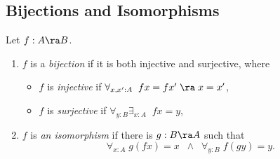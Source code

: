 \subsection{Bijections and Isomorphisms}

\begin{defn} 
Let $f:A\ra B$.
\begin{enumerate}
\item $f$ is a {\em bijection} if it is both injective and surjective, where
\begin{itemize}
\item $f$ is {\em injective} if $\forall_{x,x':A}\; \; fx=fx'\;\ra\; x=x'$,
\item $f$ is {\em surjective} if $\forall_{y:B}\exists_{x:A}\;\; fx=y$,
\end{itemize}
\item $f$ is {\em an isomorphism} if there is $g:B\ra A$ such that 
  \[\forall_{x:A}\; g(fx)=x\;\;\wedge\;\;\forall_{y:B}\; f(gy)=y.\]
\end{enumerate}
\end{defn}


